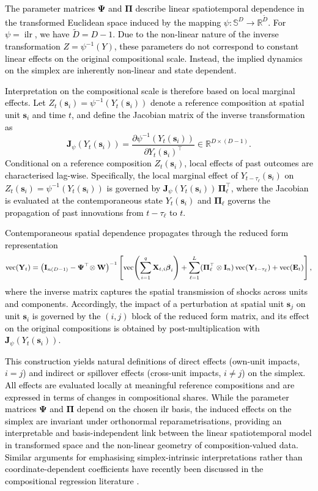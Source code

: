 \documentclass[12pt]{article}
\theoremstyle{plain}
\theoremstyle{definition}
\DeclareMathOperator{\vop}{vec}
\newcommand{\xvec}{\boldsymbol}
\newcommand{\xmat}{\mathbf}
\DeclareMathOperator{\ilr}{ilr}
\begin{document}
\textcolor{black}{The parameter matrices $\xmat{\Psi}$ and $\xmat{\Pi}$ describe linear spatiotemporal dependence in the transformed Euclidean space induced by the mapping $\psi:\mathds{S}^D \rightarrow \mathds{R}^{\tilde D}$. For $\psi=\ilr$, we have $\tilde D = D-1$. Due to the non-linear nature of the inverse transformation $Z=\psi^{-1}(Y)$, these parameters do not correspond to constant linear effects on the original compositional scale. Instead, the implied dynamics on the simplex are inherently non-linear and state dependent.}

\textcolor{black}{Interpretation on the compositional scale is therefore based on local marginal effects. Let $Z_t(\xvec{s}_i)=\psi^{-1}(Y_t(\xvec{s}_i))$ denote a reference composition at spatial unit $\xvec{s}_i$ and time $t$, and define the Jacobian matrix of the inverse transformation as
\[
\mathbf{J}_\psi\!\left(Y_t(\xvec{s}_i)\right)
=
\frac{\partial \psi^{-1}(Y_t(\xvec{s}_i))}{\partial Y_t(\xvec{s}_i)^\top}
\in \mathds{R}^{D\times (D-1)}.
\]
Conditional on a reference composition $Z_t(\xvec{s}_i)$, local effects of past outcomes are characterised lag-wise. Specifically, the local marginal effect of $Y_{t-\tau_\ell}(\xvec{s}_i)$ on $Z_t(\xvec{s}_i)=\psi^{-1}(Y_t(\xvec{s}_i))$ is governed by $\mathbf{J}_\psi(Y_t(\xvec{s}_i))\,\xmat{\Pi}_\ell^\top$, where the Jacobian is evaluated at the contemporaneous state $Y_t(\xvec{s}_i)$ and $\xmat{\Pi}_\ell$ governs the propagation of past innovations from $t-\tau_\ell$ to $t$.}

\textcolor{black}{Contemporaneous spatial dependence propagates through the reduced form representation
\[
\small{\mathrm{vec}(\xmat{Y}_t)
=
\left(\xmat{I}_{n(D-1)}-\xmat{\Psi}^\top\!\otimes \xmat{W}\right)^{-1}
\left[
\vop\!\left(\sum_{i=1}^{q}\xmat{X}_{t,i}\xvec{\beta}_i\right)
+
\sum_{\ell=1}^{L}(\xmat{\Pi}_\ell^\top\otimes \xmat{I}_n)\,\mathrm{vec}(\xmat{Y}_{t-\tau_\ell})
+
\vop(\xmat{E}_t)
\right],}
\]
where the inverse matrix captures the spatial transmission of shocks across units and components. Accordingly, the impact of a perturbation at spatial unit $\xvec{s}_j$ on unit $\xvec{s}_i$ is governed by the $(i,j)$ block of the reduced form matrix, and its effect on the original compositions is obtained by post-multiplication with $\mathbf{J}_\psi(Y_t(\xvec{s}_i))$.}

\textcolor{black}{This construction yields natural definitions of direct effects (own-unit impacts, $i=j$) and indirect or spillover effects (cross-unit impacts, $i\neq j$) on the simplex. All effects are evaluated locally at meaningful reference compositions and are expressed in terms of changes in compositional shares. While the parameter matrices $\xmat{\Psi}$ and $\xmat{\Pi}$ depend on the chosen ilr basis, the induced effects on the simplex are invariant under orthonormal reparametrisations, providing an interpretable and basis-independent link between the linear spatiotemporal model in transformed space and the non-linear geometry of composition-valued data. Similar arguments for emphasising simplex-intrinsic interpretations rather than coordinate-dependent coefficients have recently been discussed in the compositional regression literature \citep{DARGEL2024107945}.}
\end{document}
